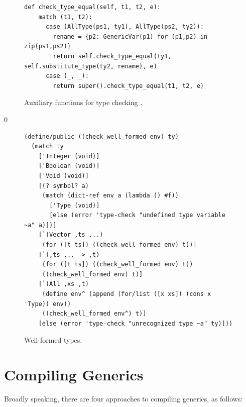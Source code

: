 \documentclass[7x10]{TimesAPriori_MIT}%
\def\racketEd{0}
\def\edition{1}
\numberwithin{theorem}{chapter}
\numberwithin{definition}{chapter}
\numberwithin{equation}{chapter}
\begin{document}
\begin{figure}[tbp]
\begin{tcolorbox}[colback=white]
{\begin{lstlisting}[basicstyle=\ttfamily\scriptsize]
def check_type_equal(self, t1, t2, e):
    match (t1, t2):
      case (AllType(ps1, ty1), AllType(ps2, ty2)):
        rename = {p2: GenericVar(p1) for (p1,p2) in zip(ps1,ps2)}
        return self.check_type_equal(ty1, self.substitute_type(ty2, rename), e)
      case (_, _):
        return super().check_type_equal(t1, t2, e)
\end{lstlisting}
\fi}
\end{tcolorbox}

\caption{Auxiliary functions for type checking \LangPoly{}.}
\label{fig:type-check-Lpoly-aux}
\end{figure}


{\if\edition\racketEd    
\begin{figure}[tbp]
\begin{tcolorbox}[colback=white]  
\begin{lstlisting}
(define/public ((check_well_formed env) ty)
  (match ty
    ['Integer (void)]
    ['Boolean (void)]
    ['Void (void)]
    [(? symbol? a)
     (match (dict-ref env a (lambda () #f))
       ['Type (void)]
       [else (error 'type-check "undefined type variable ~a" a)])]
    [`(Vector ,ts ...)
     (for ([t ts]) ((check_well_formed env) t))]
    [`(,ts ... -> ,t)
     (for ([t ts]) ((check_well_formed env) t))
     ((check_well_formed env) t)]
    [`(All ,xs ,t)
     (define env^ (append (for/list ([x xs]) (cons x 'Type)) env))
     ((check_well_formed env^) t)]
    [else (error 'type-check "unrecognized type ~a" ty)]))
\end{lstlisting}
\end{tcolorbox}

\caption{Well-formed types.}
\label{fig:well-formed-types}
\end{figure}
\fi}

\clearpage

\section{Compiling Generics}
\label{sec:compiling-poly}

Broadly speaking, there are four approaches to compiling generics, as
follows:
\end{document}
